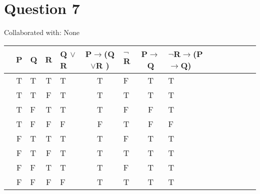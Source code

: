\documentclass{article}
\begin{document}
\section{Question 7}
Collaborated with: None
\begin{table}[h]
\begin{tabular}{lclclclclclclc|c|}
\hline
 &P & Q & R & Q $\vee$  R & P$\rightarrow$(Q$\vee$R ) &$\lnot$R  &  P$\rightarrow$Q& $\lnot$R$\rightarrow$(P$\rightarrow$Q) \\
 \hline
 &T & T  & T   & \hspace{3mm}  T    & T &  \hspace{2mm}F& T &\hspace{9mm }T & \\ 
 \hline
 &T & T  & F  &\hspace{3mm} T      & T & \hspace{2mm}T & T &\hspace{8mm} T &\\ 
 \hline
 &T & F  & T  &\hspace{3mm}  T     & T & \hspace{2mm}F & F &\hspace{8mm} T &\\ 
 \hline
 &T & F  & F  &\hspace{3mm}   F    &F  &\hspace{2mm}T  &F  &\hspace{8mm} F& \\ 
 \hline
 &F & T  & T  &\hspace{3mm}  T     & T & \hspace{2mm}F & T &\hspace{8mm} T  &\\ 
 \hline
 &F & T  & F  &\hspace{3mm}   T    & T & \hspace{2mm}T& T & \hspace{8mm} T &\\ 
 \hline
  &F& F  &T   &\hspace{3mm} T      & T & \hspace{2mm}F &T  &\hspace{8mm} T & \\ 
 \hline
  &F& F  & F  &\hspace{3mm}  F     &T &\hspace{2mm}T &T  &\hspace{8mm} T&
\end{tabular}
\end{table}
\end{document}
